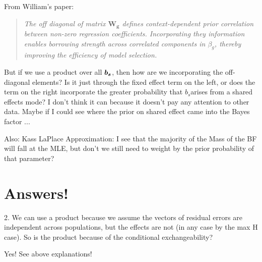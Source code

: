 \documentclass[10pt]{article}
\newcommand{\bs}{\mbox{\boldmath$b_{s}$}}
\begin{document}
From William's paper:
\begin{quote}
\emph{The off diagonal of matrix $\mathbf{W_{g}}$ defines context-dependent prior correlation between non-zero regression coefficients. Incorporating they information enables borrowing strength across correlated components in $\beta_{g}$, thereby improving the efficiency of model selection.}
\end{quote}

But if we use a product over all $\bs$, then how are we incorporating the off-diagonal elements? Is it just through the fixed effect term on the left, or does the term on the right incorporate the greater probability that \bs arises from a shared effects mode? I don't think it can because it doesn't pay any attention to other data. Maybe if I could see where the prior on shared effect came into the Bayes factor ...

Also: Kass LaPlace Approximation: I see that the majority of the Mass of the BF will fall at the MLE, but don't we still need to weight by the prior probability of that parameter?

\section{Answers!}

\item{2. We can use a product because we assume the vectors of residual errors are independent across populations, but the effects are not (in any case by the max H case). So is the product because of the conditional exchangeability?}

Yes! See above explanations!
\end{document}
